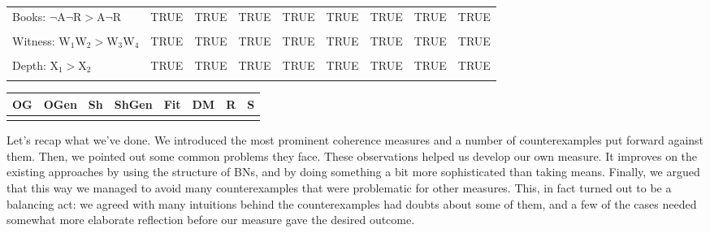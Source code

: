 \documentclass[10pt,]{scrartcl}
\begin{document}
\begin{table}[H]
{\begin{tabular}{lllllllll}
Books: $\neg$A$\neg$R$>$A$\neg$R & TRUE & TRUE & TRUE & TRUE & TRUE & TRUE & TRUE & TRUE\\
\cellcolor{gray!6}{Books: $\neg$A$\neg$R$>\neg$AR} & \cellcolor{gray!6}{TRUE} & \cellcolor{gray!6}{TRUE} & \cellcolor{gray!6}{TRUE} & \cellcolor{gray!6}{TRUE} & \cellcolor{gray!6}{TRUE} & \cellcolor{gray!6}{TRUE} & \cellcolor{gray!6}{TRUE} & \cellcolor{gray!6}{TRUE}\\
Witness: W$_1$W$_2>$W$_3$W$_4$ & TRUE & TRUE & TRUE & TRUE & TRUE & TRUE & TRUE & TRUE\\
\cellcolor{gray!6}{Witness: W$_4$W$_5>$W$_3$W$_4$} & \cellcolor{gray!6}{TRUE} & \cellcolor{gray!6}{TRUE} & \cellcolor{gray!6}{TRUE} & \cellcolor{gray!6}{TRUE} & \cellcolor{gray!6}{TRUE} & \cellcolor{gray!6}{TRUE} & \cellcolor{gray!6}{TRUE} & \cellcolor{gray!6}{TRUE}\\
Depth: X$_1>$X$_2$ & TRUE & TRUE & TRUE & TRUE & TRUE & TRUE & TRUE & TRUE\\
\cellcolor{gray!6}{Dodecahedron:  Regular $=$  Dodecahedron} & \cellcolor{gray!6}{TRUE} & \cellcolor{gray!6}{TRUE} & \cellcolor{gray!6}{FALSE} & \cellcolor{gray!6}{FALSE} & \cellcolor{gray!6}{FALSE} & \cellcolor{gray!6}{FALSE} & \cellcolor{gray!6}{FALSE} & \cellcolor{gray!6}{TRUE}\\
\bottomrule
\end{tabular}}
\end{table}

\begin{table}[H]
\centering
\begin{tabular}{rrrrrrrr}
\toprule
OG & OGen & Sh & ShGen & Fit & DM & R & S\\
\midrule
\cellcolor{gray!6}{0.733} & \cellcolor{gray!6}{0.733} & \cellcolor{gray!6}{0.706} & \cellcolor{gray!6}{0.647} & \cellcolor{gray!6}{0.706} & \cellcolor{gray!6}{0.647} & \cellcolor{gray!6}{0.706} & \cellcolor{gray!6}{1}\\
\bottomrule
\end{tabular}
\end{table}

Let's recap what we've done. We introduced the most prominent coherence
measures and a number of counterexamples put forward against them. Then,
we pointed out some common problems they face. These observations helped
us develop our own measure. It improves on the existing approaches by
using the structure of BNs, and by doing something a bit more
sophisticated than taking means. Finally, we argued that this way we
managed to avoid many counterexamples that were problematic for other
measures. This, in fact turned out to be a balancing act: we agreed with
many intuitions behind the counterexamples had doubts about some of
them, and a few of the cases needed somewhat more elaborate reflection
before our measure gave the desired outcome.
\end{document}
